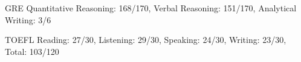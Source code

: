 


\begin{cvskills}
\cvskill
{GRE}
{Quantitative Reasoning: 168/170, Verbal Reasoning: 151/170, Analytical Writing: 3/6}

\cvskill
{TOEFL}
{Reading: 27/30, Listening: 29/30, Speaking: 24/30, Writing: 23/30, Total: 103/120}

\end{cvskills}